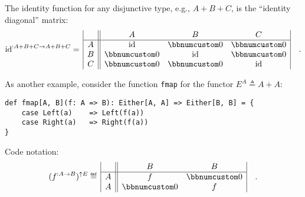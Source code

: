 The identity function for any disjunctive type, e.g., $A+B+C$, is
the \textsf{``}identity diagonal\textsf{''} matrix:
\[
\text{id}^{:A+B+C\rightarrow A+B+C}=\,\begin{array}{|c||ccc|}
 & A & B & C\\
\hline A & \text{id} & \bbnum 0 & \bbnum 0\\
B & \bbnum 0 & \text{id} & \bbnum 0\\
C & \bbnum 0 & \bbnum 0 & \text{id}
\end{array}\quad.
\]

As another example, consider the function \lstinline!fmap! for the
functor $E^{A}\triangleq A+A$:
\begin{lstlisting}
def fmap[A, B](f: A => B): Either[A, A] => Either[B, B] = {
    case Left(a)    => Left(f(a))
    case Right(a)   => Right(f(a))
}
\end{lstlisting}
Code notation:
\[
(f^{:A\rightarrow B})^{\uparrow E}\triangleq\,\begin{array}{|c||cc|}
 & B & B\\
\hline A & f & \bbnum 0\\
A & \bbnum 0 & f
\end{array}\quad.
\]

